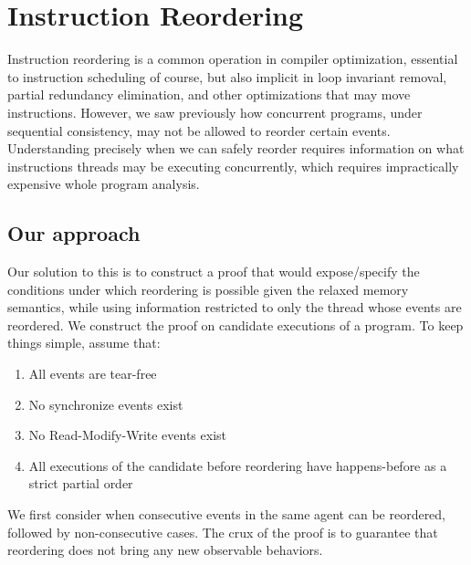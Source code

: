 


\section{Instruction Reordering}
    Instruction reordering is a common operation in compiler optimization, essential to 
    instruction scheduling of course, but also implicit in loop invariant removal, partial redundancy
    elimination, and other optimizations that may move instructions.
    However, we saw previously how concurrent programs, under sequential consistency, may not be allowed to reorder certain events. Understanding precisely when we can safely reorder requires information on what instructions threads may be executing concurrently, which requires impractically expensive whole program analysis.
    
    \subsection{Our approach}
    Our solution to this is to construct a proof that would expose/specify the conditions under which reordering is possible given the relaxed memory semantics, while using information restricted to only the thread whose events are reordered.  We construct the proof on candidate executions of a program. To keep things simple, assume that: 
    
    \begin{enumerate}
        \item All events are tear-free
        \item No synchronize events exist
        \item No Read-Modify-Write events exist
        \item All executions of the candidate before reordering have happens-before as a strict partial order
    \end{enumerate}
    
    We first consider when consecutive events in the same agent can be reordered, followed by non-consecutive cases. The crux of the proof is to guarantee that reordering does not bring any new observable behaviors.
    


